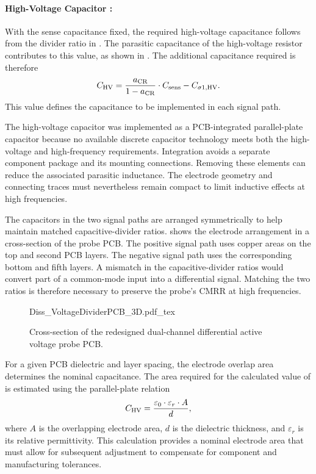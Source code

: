 \FloatBarrier

\paragraph*{High-Voltage Capacitor {\boldmath{}}:}
With the sense capacitance fixed, the required high-voltage capacitance follows from the divider ratio in .
The parasitic capacitance  of the high-voltage resistor contributes to this value, as shown in .
The additional capacitance required is therefore
\begin{equation}
	{C}_{\mathrm{HV}} = \frac{{a}_{\mathrm{CR}}}{1-{a}_{\mathrm{CR}}} \cdot {C}_{\mathrm{sens}} - {C}_{\mathrm{\sigma 1,HV}}.
\end{equation}
This value defines the capacitance to be implemented in each signal path.

The high-voltage capacitor  was implemented as a PCB-integrated parallel-plate capacitor because no available discrete capacitor technology meets both the high-voltage and high-frequency requirements.
Integration avoids a separate component package and its mounting connections.
Removing these elements can reduce the associated parasitic inductance.
The electrode geometry and connecting traces must nevertheless remain compact to limit inductive effects at high frequencies.

The capacitors in the two signal paths are arranged symmetrically to help maintain matched capacitive-divider ratios.
 shows the electrode arrangement in a cross-section of the probe PCB.
The positive signal path uses copper areas on the top and second PCB layers.
The negative signal path uses the corresponding bottom and fifth layers.
A mismatch in the capacitive-divider ratios would convert part of a common-mode input into a differential signal.
Matching the two ratios is therefore necessary to preserve the probe's CMRR at high frequencies.

\begin{figure}[ht]
	\centering
	{Diss_VoltageDividerPCB_3D.pdf_tex}
	\caption{Cross-section of the redesigned dual-channel differential active voltage probe PCB.}\label{fig:VoltageDividerPCB}
\end{figure}

For a given PCB dielectric and layer spacing, the electrode overlap area determines the nominal capacitance.
The area required for the calculated value of  is estimated using the parallel-plate relation
\begin{equation}
	{C}_{\mathrm{HV}} = \frac{\varepsilon_0 \cdot \varepsilon_r \cdot A}{d},
\end{equation}
where $A$ is the overlapping electrode area, $d$ is the dielectric thickness, and $\varepsilon_r$ is its relative permittivity.
This calculation provides a nominal electrode area that must allow for subsequent adjustment to compensate for component and manufacturing tolerances.

